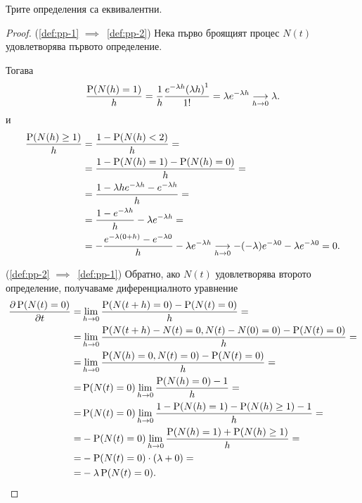 \documentclass[numbers=endperiod, bibliography=totocnumbered]{scrartcl}
\begin{document}
\begin{theorem}
  Трите определения са еквивалентни.
\end{theorem}
\begin{proof}
  (\ref{def:pp-1} \( \implies \)~\ref{def:pp-2}) Нека първо броящият процес \( N(t) \) удовлетворява първото определение.

  Тогава
  \begin{align*}
    \frac {\Prob(N(h) = 1)} h
    =
    \frac 1 h \frac {e^{-\lambda h} {(\lambda h)}^1} {1!}
    =
    \lambda e^{-\lambda h}
    \Conv[h \to 0]{}
    \lambda.
  \end{align*}
  и
  \begin{align*}
    \frac {\Prob(N(h) \geq 1)} h
    &=
    \frac {1 - \Prob(N(h) < 2)} h
    = \\ &=
    \frac {1 - \Prob(N(h) = 1) - \Prob(N(h) = 0)} h
    = \\ &=
    \frac {1 - \lambda h e^{-\lambda h} - e^{-\lambda h}} h
    = \\ &=
    \frac {1 - e^{-\lambda h}} h - \lambda e^{-\lambda h}
    = \\ &=
    - \frac {e^{-\lambda (0 + h)} - e^{-\lambda 0}} h - \lambda e^{-\lambda h}
    \Conv[h \to 0]{}
    -(-\lambda) e^{-\lambda 0} - \lambda e^{-\lambda 0}
    =
    0.
  \end{align*}

  (\ref{def:pp-2} \( \implies \)~\ref{def:pp-1}) Обратно, ако \( N(t) \) удовлетворява второто определение, получаваме диференциалното уравнение
  \begin{align*}
    \frac {\partial \Prob(N(t) = 0)} {\partial t}
    =&
    \lim_{h \to 0} \frac {\Prob(N(t+h) = 0) - \Prob(N(t) = 0)} h
    = \\ =&
    \lim_{h \to 0} \frac {\Prob(N(t+h) - N(t) = 0, N(t) - N(0) = 0) - \Prob(N(t) = 0)} h
    = \\ =&
    \lim_{h \to 0} \frac {\Prob(N(h) = 0, N(t) = 0) - \Prob(N(t) = 0)} h
    = \\ =&
    \Prob(N(t) = 0) \lim_{h \to 0} \frac {\Prob(N(h) = 0) - 1} h
    = \\ =&
    \Prob(N(t) = 0) \lim_{h \to 0} \frac {1 - \Prob(N(h) = 1) - \Prob(N(h) \geq 1) - 1} h
    = \\ =&
    - \Prob(N(t) = 0) \lim_{h \to 0} \frac {\Prob(N(h) = 1) + \Prob(N(h) \geq 1)} h
    = \\ =&
    - \Prob(N(t) = 0) \cdot (\lambda + 0)
    = \\ =&
    -\lambda \Prob(N(t) = 0).
  \end{align*}


\end{proof}
\end{document}
